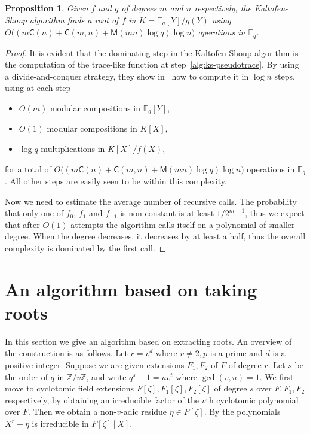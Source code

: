 \documentclass[12pt]{article}
\theoremstyle{plain}
\newtheorem{proposition}[theorem]{Proposition}
\theoremstyle{definition}
\def\Z{\ensuremath{\mathbb{Z}}}
\def\F{\ensuremath{\mathbb{F}}}
\def\MM{\ensuremath{\mathsf{M}}}
\def\CC{\ensuremath{\mathsf{C}}}
\newcounter{algorithm}
\begin{document}
\begin{proposition}
  Given $f$ and $g$ of degrees $m$ and $n$ respectively, the
  Kaltofen-Shoup algorithm finds a root of $f$ in $K=\F_q[Y]/g(Y)$
  using $O\bigl((m\CC(n) + \CC(m,n) + \MM(mn)\log q)\log n\bigr)$
  operations in $\F_q$.
\end{proposition}
\begin{proof}
  It is evident that the dominating step in the Kaltofen-Shoup
  algorithm is the computation of the trace-like function at
  step~\ref{alg:ks-pseudotrace}. By using a divide-and-conquer
  strategy, they show in~\cite{kaltofen+shoup97} how to compute it in
  $\log n$ steps, using at each step
  \begin{itemize}
  \item $O(m)$ modular compositions in $\F_q[Y]$,
  \item $O(1)$ modular compositions in $K[X]$,
  \item $\log q$ multiplications in $K[X]/f(X)$,
  \end{itemize}
  for a total of $O\bigl((m\CC(n) + \CC(m,n) + \MM(mn)\log q)\log
  n\bigr)$ operations in $\F_q$.  All other steps are easily seen to
  be within this complexity.

  Now we need to estimate the average number of recursive calls. The
  probability that only one of $f_0$, $f_1$ and $f_{-1}$ is
  non-constant is at least $1/2^{m-1}$, thus we expect that after
  $O(1)$ attempts the algorithm calls itself on a polynomial of
  smaller degree. When the degree decreases, it decreases by at least
  a half, thus the overall complexity is dominated by the first call.
\end{proof}



\section{An algorithm based on taking roots}


In this section we give an algorithm based on extracting roots. An overview of the construction is 
as follows. Let $r = v^d$ where $v \ne 2, p$ is a prime and $d$ is a positive integer. Suppose we 
are given extensions $F_1, F_2$ of $F$ of degree $r$. Let $s$ be the order of $q$ in $\Z / v\Z$, 
and write $q^s - 1 = uv^t$ where $\gcd(v, u) = 1$. We first move to cyclotomic field extensions 
$F[\zeta], F_1[\zeta], F_2[\zeta]$ of degree $s$ over $F, F_1, F_2$ respectively, by obtaining an 
irreducible factor of the $v$th cyclotomic polynomial over $F$. Then we obtain a  non-$v$-adic 
residue $\eta \in F[\zeta]$. By \cite[Th.\ VI.9.1]{lang} the polynomials $X^r - \eta$ is 
irreducible in $F[\zeta][X]$. 
\end{document}
